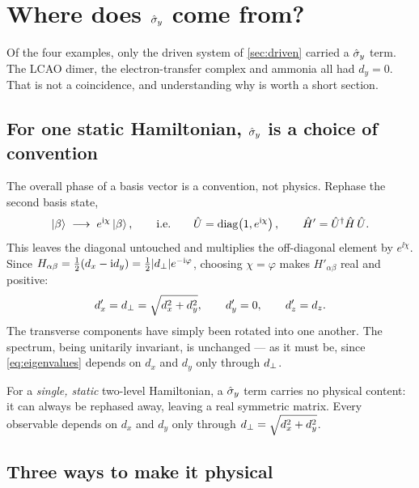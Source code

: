 \section{Where does $\hat{\sigma}_y$ come from?}
\label{sec:sigmay}

Of the four examples, only the driven system of \cref{sec:driven} carried a $\hat{\sigma}_y$ term.
The LCAO dimer, the electron-transfer complex and ammonia all had $d_y=0$. That is not a
coincidence, and understanding why is worth a short section.

\subsection{For one static Hamiltonian, $\hat{\sigma}_y$ is a choice of convention}

The overall phase of a basis vector is a convention, not physics. Rephase the second
basis state,
%
\begin{equation}
\ket{\beta} \;\longrightarrow\; e^{\mathrm{i}\chi}\ket{\beta},
\qquad\text{i.e.}\qquad
\hat{U} = \mathrm{diag}\!\left(1, e^{\mathrm{i}\chi}\right),
\qquad
\hat{H}' = \hat{U}^\dagger \hat{H}\, \hat{U}.
\label{eq:rephase}
\end{equation}
%
This leaves the diagonal untouched and multiplies the off-diagonal element by
$e^{\ii\chi}$. Since $H_{\alpha\beta} = \tfrac{1}{2}(d_x-\mathrm{i} d_y) = \tfrac{1}{2}|d_{\perp}|e^{-\mathrm{i}\varphi}$,
choosing $\chi=\varphi$ makes $H'_{\alpha\beta}$ real and positive:
%
\begin{equation}
d_x' = d_{\perp} = \sqrt{d_x^2+d_y^2}, \qquad d_y' = 0, \qquad d_z' = d_z .
\end{equation}
%
The transverse components have simply been rotated into one another. The spectrum,
being unitarily invariant, is unchanged --- as it must be, since \cref{eq:eigenvalues}
depends on $d_x$ and $d_y$ only through $d_{\perp}$.

\begin{keyresult}
For a \emph{single, static} two-level Hamiltonian, a $\hat{\sigma}_y$ term carries no physical
content: it can always be rephased away, leaving a real symmetric matrix. Every
observable depends on $d_x$ and $d_y$ only through $d_{\perp} = \sqrt{d_x^2+d_y^2}$.
\end{keyresult}

\subsection{Three ways to make it physical}

